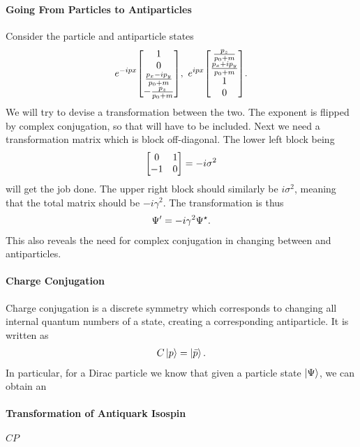 \paragraph{Going From Particles to Antiparticles}
Consider the particle and antiparticle states
\begin{align*}
	e^{-ipx}\mqty[
		1 \\
		0 \\
		\frac{p_{x} - ip_{y}}{p_{0} + m} \\
		-\frac{p_{	z}}{p_{0} + m}
	],\ e^{ipx}\mqty[
		\frac{p_{z}}{p_{0} + m} \\
		\frac{p_{x} + ip_{y}}{p_{0} + m} \\
		1 \\
		0
	].
\end{align*}
We will try to devise a transformation between the two. The exponent is flipped by complex conjugation, so that will have to be included. Next we need a transformation matrix which is block off-diagonal. The lower left block being
\begin{align*}
	\mqty[
		0  & 1 \\
		-1 & 0
	] = -i\sigma^{2}
\end{align*}
will get the job done. The upper right block should similarly be $i\sigma^{2}$, meaning that the total matrix should be $-i\gamma^{2}$. The transformation is thus
\begin{align*}
	\Psi^{\prime} = -i\gamma^{2}\Psi^{\star}.
\end{align*}
This also reveals the need for complex conjugation in changing between and antiparticles.

\paragraph{Charge Conjugation}
Charge conjugation is a discrete symmetry which corresponds to changing all internal quantum numbers of a state, creating a corresponding antiparticle. It is written as
\begin{align*}
	C\ket{p} = \ket{\bar{p}}.
\end{align*}
In particular, for a Dirac particle we know that given a particle state $\ket{\Psi}$, we can obtain an 

\paragraph{Transformation of Antiquark Isospin}

\paragraph{$CP$}

